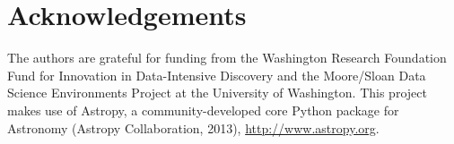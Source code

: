 \documentclass[twocolumn]{aastex6}
\begin{document}


\section*{Acknowledgements}
The authors are grateful for funding from the Washington Research Foundation Fund for Innovation in Data-Intensive Discovery and the Moore/Sloan Data Science Environments Project at the University of Washington. This project makes use of Astropy, a community-developed core Python package for Astronomy (Astropy Collaboration, 2013), \url{http://www.astropy.org}.



\end{document}
